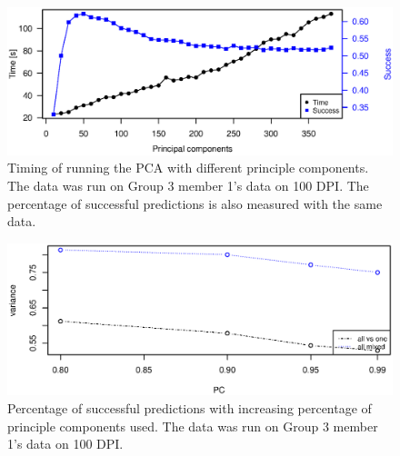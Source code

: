 \begin{figure}
\centering
\includegraphics[width =0.8 \textwidth]{graphics/pca_timing}
\caption{Timing of running the PCA with different principle components. 
The data was run on Group 3 member 1's data on 100 DPI. 
The percentage of successful predictions is also measured with the same data.}
\label{fig:pca_timing}
\end{figure}

\begin{figure}
\centering
\includegraphics[width =0.8 \textwidth]{graphics/pca_success}
\caption{Percentage of successful predictions with increasing percentage of principle components used.
The data was run on Group 3 member 1's data on 100 DPI. }
\label{fig:pca_success}
\end{figure}

